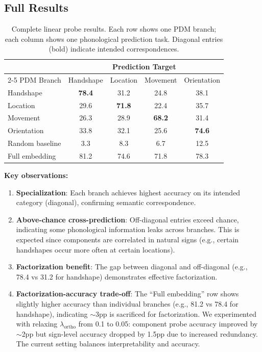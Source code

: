 \documentclass{article}
\begin{document}
\subsection{Full Results}

\begin{table}[ht]
\caption{Complete linear probe results. Each row shows one PDM branch; each column shows one phonological prediction task. Diagonal entries (bold) indicate intended correspondences.}
\label{tab:full_probe}
\vspace{-1mm}
\begin{center}
\begin{small}
\begin{tabular*}{\columnwidth}{@{\extracolsep{\fill}}lcccc@{}}
\toprule
& \multicolumn{4}{c}{Prediction Target} \\
\cmidrule(lr){2-5}
PDM Branch & Handshape & Location & Movement & Orientation \\
\midrule
Handshape & \textbf{78.4} & 31.2 & 24.8 & 38.1 \\
Location & 29.6 & \textbf{71.8} & 22.4 & 35.7 \\
Movement & 26.3 & 28.9 & \textbf{68.2} & 31.4 \\
Orientation & 33.8 & 32.1 & 25.6 & \textbf{74.6} \\
\midrule
Random baseline & 3.3 & 8.3 & 6.7 & 12.5 \\
Full embedding & 81.2 & 74.6 & 71.8 & 78.3 \\
\bottomrule
\end{tabular*}
\end{small}
\end{center}
\vspace{-2mm}
\end{table}

\textbf{Key observations:}
\begin{enumerate}[nosep,topsep=2pt]
\item \textbf{Specialization}: Each branch achieves highest accuracy on its intended category (diagonal), confirming semantic correspondence.
\item \textbf{Above-chance cross-prediction}: Off-diagonal entries exceed chance, indicating some phonological information leaks across branches. This is expected since components are correlated in natural signs (e.g., certain handshapes occur more often at certain locations).
\item \textbf{Factorization benefit}: The gap between diagonal and off-diagonal (e.g., 78.4 vs 31.2 for handshape) demonstrates effective factorization.
\item \textbf{Factorization-accuracy trade-off}: The ``Full embedding'' row shows slightly higher accuracy than individual branches (e.g., 81.2 vs 78.4 for handshape), indicating $\sim$3pp is sacrificed for factorization. We experimented with relaxing $\lambda_{\text{ortho}}$ from 0.1 to 0.05: component probe accuracy improved by $\sim$2pp but sign-level accuracy dropped by 1.5pp due to increased redundancy. The current setting balances interpretability and accuracy.
\end{enumerate}
\end{document}
